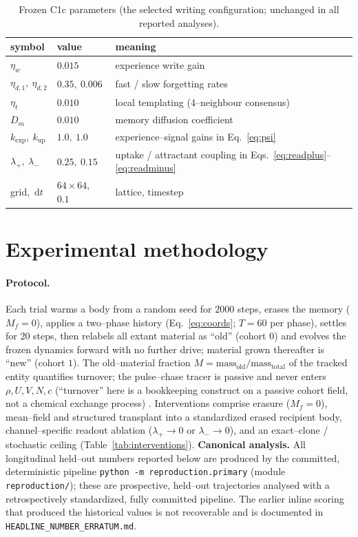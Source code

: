\documentclass[11pt]{article}
\begin{document}
\begin{table}[t]\centering\small
\caption{Frozen C1c parameters (the selected writing configuration; unchanged in all reported analyses).}
\label{tab:params}
\begin{tabular}{@{}lll@{}}\toprule
symbol & value & meaning\\\midrule
$\eta_w$ & $0.015$ & experience write gain\\
$\eta_{d,1},\ \eta_{d,2}$ & $0.35,\ 0.006$ & fast / slow forgetting rates\\
$\eta_t$ & $0.010$ & local templating (4--neighbour consensus)\\
$D_m$ & $0.010$ & memory diffusion coefficient\\
$k_{\exp},\ k_{\mathrm{up}}$ & $1.0,\ 1.0$ & experience--signal gains in Eq.~\eqref{eq:psi}\\
$\lambda_+,\ \lambda_-$ & $0.25,\ 0.15$ & uptake / attractant coupling in Eqs.~\eqref{eq:readplus}--\eqref{eq:readminus}\\
grid,\ $\mathrm{d}t$ & $64\times64$,\ $0.1$ & lattice, timestep\\\bottomrule
\end{tabular}
\end{table}

\section{Experimental methodology}
\label{sec:methods}
\paragraph{Protocol.} Each trial warms a body from a random seed for $2000$ steps, erases the memory
($M_f=0$), applies a two--phase history (Eq.~\ref{eq:coords}; $T=60$ per phase), settles for $20$ steps, then
relabels all extant material as ``old'' (cohort $0$) and evolves the frozen dynamics forward with no further
drive; material grown thereafter is ``new'' (cohort $1$). The old--material fraction
$M=\text{mass}_{\text{old}}/\text{mass}_{\text{total}}$ of the tracked entity quantifies turnover; the pulse--chase tracer is passive and never enters $\rho,U,V,N,c$ (``turnover'' here is a bookkeeping construct on a passive cohort field, not a chemical exchange process) \citep{jaqaman2008}. Interventions comprise erasure ($M_f=0$),
mean--field and structured transplant into a standardized erased recipient body, channel--specific readout ablation
($\lambda_+\!\to\!0$ or $\lambda_-\!\to\!0$), and an exact--clone / stochastic ceiling (Table~\ref{tab:interventions}). \textbf{Canonical analysis.} All longitudinal held--out numbers reported below are produced by the committed, deterministic pipeline \texttt{python -m reproduction.primary} (module \texttt{reproduction/}); these are prospective, held--out trajectories analysed with a retrospectively standardized, fully committed pipeline. The earlier inline scoring that produced the historical values is not recoverable and is documented in \texttt{HEADLINE\_NUMBER\_ERRATUM.md}.
\end{document}
